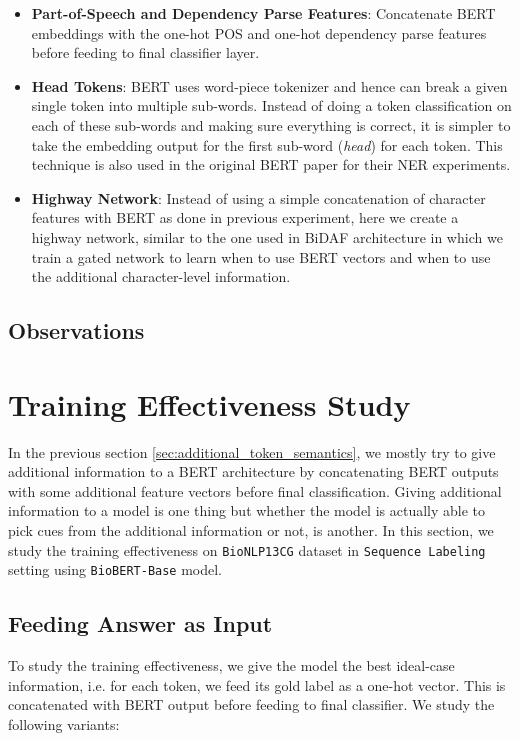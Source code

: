 \begin{itemize}
    \item \textbf{Part-of-Speech and Dependency Parse Features}: Concatenate BERT embeddings with the one-hot POS and one-hot dependency parse features before feeding to final classifier layer.
    
    \item \textbf{Head Tokens}: BERT uses word-piece tokenizer and hence can break a given single token into multiple sub-words. Instead of doing a token classification on each of these sub-words and making sure everything is correct, it is simpler to take the embedding output for the first sub-word (\textit{head}) for each token. This technique is also used in the original BERT paper \cite{devlin2018bert} for their NER experiments. 
    
    \item \textbf{Highway Network}: Instead of using a simple concatenation of character features with BERT as done in previous experiment, here we create a highway network\cite{}, similar to the one used in BiDAF\cite{} architecture in which we train a gated network to learn when to use BERT vectors and when to use the additional character-level information.
\end{itemize}

\subsection{Observations}


\section{Training Effectiveness Study}
In the previous section \ref{sec:additional_token_semantics}, we mostly try to give additional information to a BERT architecture by concatenating BERT outputs with some additional feature vectors before final classification. Giving additional information to a model is one thing but whether the model is actually able to pick cues from the additional information or not, is another. In this section, we study the training effectiveness on \texttt{BioNLP13CG} dataset in \texttt{Sequence Labeling} setting using \texttt{BioBERT-Base} model.

\subsection{Feeding Answer as Input}

To study the training effectiveness, we give the model the best ideal-case information, i.e. for each token, we feed its gold label as a one-hot vector. This is concatenated with BERT output before feeding to final classifier. We study the following variants:

